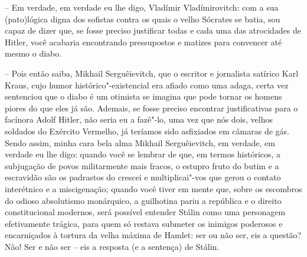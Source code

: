 -- Em verdade, em verdade eu lhe digo, Vladímir Vladímirovitch: com a
sua (pato)lógica digna dos sofistas contra os quais o velho Sócrates se
batia, sou capaz de dizer que, se fosse preciso justificar todas e cada
uma das atrocidades de Hitler, você acabaria encontrando pressupostos e
matizes para convencer até mesmo o diabo.

-- Pois então saiba, Mikhail Serguêievitch, que o escritor e jornalista
satírico Karl Kraus, cujo humor histórico"-existencial era afiado como
uma adaga, certa vez sentenciou que o diabo é um otimista se imagina que
pode tornar os homens piores do que eles já são. Ademais, se fosse
preciso encontrar justificativas para o facínora Adolf Hitler, não seria
eu a fazê"-lo, uma vez que nós dois, velhos soldados do Exército
Vermelho, já teríamos sido asfixiados em câmaras de gás. Sendo assim,
minha cara bela alma Mikhail Serguêievitch, em verdade, em verdade eu
lhe digo: quando você se lembrar de que, em termos históricos, a
subjugação de povos militarmente mais fracos, o estupro fruto do butim e
a escravidão são os padrastos do crescei e multiplicai"-vos que gerou o
contato interétnico e a miscigenação; quando você tiver em mente que,
sobre os escombros do odioso absolutismo monárquico, a guilhotina pariu
a república e o direito constitucional modernos, será possível entender
Stálin como uma personagem efetivamente trágica, para quem só restava
submeter os inimigos poderosos e encarniçados à tortura da velha máxima
de Hamlet: ser ou não ser, eis a questão? Não! Ser e não ser -- eis a
resposta (e a sentença) de Stálin.


